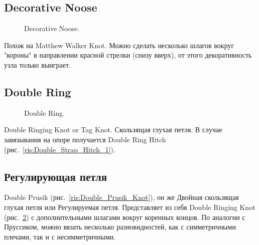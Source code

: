 \subsection{Decorative Noose}

\begin{figure}[H]\centering
	\begin{minipage}{1\linewidth}
		\begin{center}
			\tcbox[enhanced jigsaw,colframe=black,opacityframe=0.5,opacityback=0.5]
			{\centering{}}
		\end{center}
	\end{minipage}
\caption{Decorative Noose.}
\label{ris:Decorative_Noose}
\end{figure}

Похож на Matthew Walker Knot. Можно сделать несколько шлагов вокруг "короны" в направлении красной стрелки (снизу вверх), от этого декоративность узла только выиграет.

\subsection{Double Ring}

\begin{figure}[H]\centering
	\subfloat[Завязывание]{\label{ris:Double_Ring_1}
	\tcbox[enhanced jigsaw,colframe=black,opacityframe=0.5,opacityback=0.5,height=7cm]
		{\centering
			}
		}
\hfil
	\subfloat[Результат]{\label{ris:Double_Ring_2}
	\tcbox[enhanced jigsaw,colframe=black,opacityframe=0.5,opacityback=0.5,height=7cm]
		{\centering
			}
		}
	\caption{Double Ring.}\label{ris:Double_Ring}
\end{figure}

Double Ringing Knot or Tag Knot. Скользящая глухая петля. В случае завязывания на опоре получается Double Ring Hitch (рис.~\ref{ris:Double_Strap_Hitch_1}).

\subsection{Регулирующая петля}

Double Prusik (рис.~\ref{ris:Double_Prusik_Knot}), он же Двойная скользящая глухая петля или Регулируемая петля. Представляет из себя Double Ringing Knot (рис.~\ref{ris:Double_Ring}) с дополнительными шлагами вокруг коренных концов. По аналогии с Пруссиком, можно вязать несколько разновидностей, как с симметричными плечами, так и с несимметричными.

